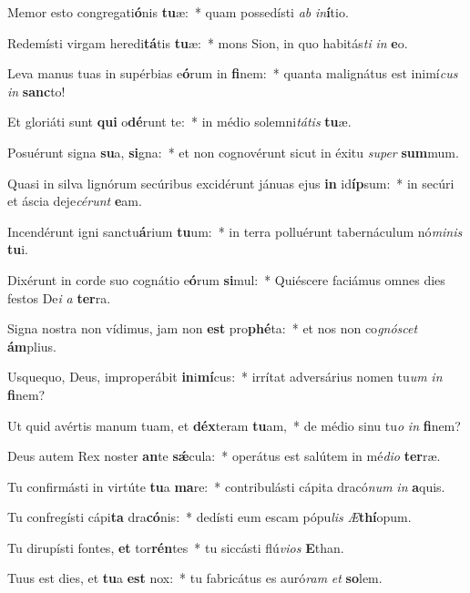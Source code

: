 \item Memor esto congregati\textbf{ó}nis \textbf{tu}æ:~* quam possedísti \textit{ab} \textit{in}\textbf{í}tio.
\item Redemísti virgam heredi\textbf{tá}tis \textbf{tu}æ:~* mons Sion, in quo habitás\textit{ti} \textit{in} \textbf{e}o.
\item Leva manus tuas in supérbias e\textbf{ó}rum in \textbf{fi}nem:~* quanta malignátus est inimí\textit{cus} \textit{in} \textbf{sanc}to!
\item Et gloriáti sunt \textbf{qui} o\textbf{dé}runt te:~* in médio solemni\textit{tá}\textit{tis} \textbf{tu}æ.
\item Posuérunt signa \textbf{su}a, \textbf{si}gna:~* et non cognovérunt sicut in éxitu \textit{su}\textit{per} \textbf{sum}mum.
\item Quasi in silva lignórum secúribus excidérunt jánuas ejus \textbf{in} id\textbf{íp}sum:~* in secúri et áscia deje\textit{cé}\textit{runt} \textbf{e}am.
\item Incendérunt igni sanctu\textbf{á}rium \textbf{tu}um:~* in terra polluérunt tabernáculum nó\textit{mi}\textit{nis} \textbf{tu}i.
\item Dixérunt in corde suo cognátio e\textbf{ó}rum \textbf{si}mul:~* Quiéscere faciámus omnes dies festos De\textit{i} \textit{a} \textbf{ter}ra.
\item Signa nostra non vídimus, jam non \textbf{est} pro\textbf{phé}ta:~* et nos non co\textit{gnó}\textit{scet} \textbf{ám}plius.
\item Usquequo, Deus, improperábit \textbf{in}i\textbf{mí}cus:~* irrítat adversárius nomen tu\textit{um} \textit{in} \textbf{fi}nem?
\item Ut quid avértis manum tuam, et \textbf{déx}teram \textbf{tu}am,~* de médio sinu tu\textit{o} \textit{in} \textbf{fi}nem?
\item Deus autem Rex noster \textbf{an}te \textbf{sǽ}cula:~* operátus est salútem in mé\textit{di}\textit{o} \textbf{ter}ræ.
\item Tu confirmásti in virtúte \textbf{tu}a \textbf{ma}re:~* contribulásti cápita dracó\textit{num} \textit{in} \textbf{a}quis.
\item Tu confregísti cápi\textbf{ta} dra\textbf{có}nis:~* dedísti eum escam pópu\textit{lis} \textit{Æ}\textbf{thí}opum.
\item Tu dirupísti fontes, \textbf{et} tor\textbf{rén}tes~* tu siccásti flú\textit{vi}\textit{os} \textbf{E}than.
\item Tuus est dies, et \textbf{tu}a \textbf{est} nox:~* tu fabricátus es auró\textit{ram} \textit{et} \textbf{so}lem.
